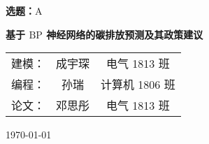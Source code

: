 \begin{titlepage}
  \begin{center}
    \vspace*{\fill}
    {\bfseries 选题：$\mathrm{A}$}
    \vspace*{\fill}

    {\bfseries 基于 $\mathrm{BP}$ 神经网络的碳排放预测及其政策建议}

    \itshape
    \begin{tabular}{ccc}
      建模：& 成宇琛 & 电气 1813 班 \\
      编程：& 孙瑞 & 计算机 1806 班 \\
      论文：& 邓思彤 & 电气 1813 班 \\
    \end{tabular}

    \today
  \end{center}
\end{titlepage}